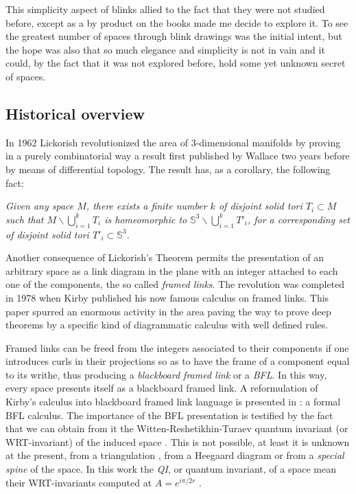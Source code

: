 This simplicity aspect of blinks allied to the fact that they were
not studied before, except as a by product on the books
\cite{kauffman1994tlr, lins1995gca} made me decide to explore it.
To see the greatest number of spaces through blink
drawings was the initial intent, but the hope was also that
so much elegance and simplicity is not in vain and it could,
by the fact that it was not explored before, hold
some yet unknown secret of spaces.

\subsection{Historical overview}
\label{sec:historicalOverview}

In 1962 Lickorish \cite{lickorish1962representation} revolutionized the area of
3-dimensional manifolds by proving in a purely combinatorial way a result first
published by Wallace \cite{wallace1960modifications} two years before by means of
differential topology. The result has, as a corollary, the following
fact:

{\em Given any space $M$, there exists a finite number $k$ of
disjoint solid tori $T_i\subset M$ such that $M \backslash
\bigcup_{i=1}^k T_i$ is homeomorphic to
$\mathbb{S}^3\backslash\bigcup_{i=1}^k T'_i$, for a corresponding set of
disjoint solid tori $T'_i \subset \mathbb{S}^3$.}

Another consequence of Lickorish's Theorem permits the
presentation of an arbitrary space as a link diagram in the plane
with an integer attached to each one of the components, the so
called {\em framed links}. The revolution was completed in 1978 when
Kirby \cite{kirby1978calculus} published his now famous calculus on framed links.
This paper spurred an enormous activity in the
area paving the way to prove deep theorems by a specific kind of
diagrammatic calculus with well defined rules.

Framed links can be freed from the integers associated to their
components if one introduces curls in their projections so as to
have the frame of a component equal to its writhe, thus producing a
{\em blackboard framed link} or a {\em BFL}. In this way, every
space presents itself as a blackboard framed link. A reformulation
of Kirby's calculus into blackboard framed link language is presented
in \cite{kauffman1991knots}: a formal BFL calculus. The importance of the
BFL presentation is
testified by the fact that we can obtain from
it the Witten-Reshetikhin-Turaev quantum invariant (or WRT-invariant) of
the induced space \cite{witten1989quantum,reshetikhin1991invariants}. This is
not possible, at least it is unknown at the present, from a
triangulation \cite{hempel1976}, from a Heegaard diagram
\cite{rolfsen2003knots} or from a {\em special spine} \cite{matveev2007algorithmic}
of the space. In this work the {\em QI}, or quantum invariant, of a
space mean their WRT-invariants computed at $A=e^{i\pi/2r}$
\cite{kauffman1994tlr}.

